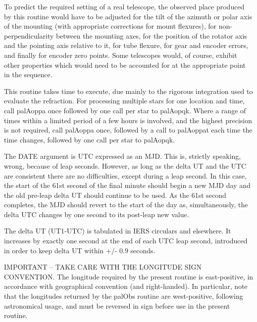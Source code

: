 \documentclass[twoside,11pt,nolof]{starlink}
\begin{document}
{{{         \sstitem
          To predict the required setting of a real telescope, the
           observed place produced by this routine would have to be
           adjusted for the tilt of the azimuth or polar axis of the
           mounting (with appropriate corrections for mount flexures),
           for non-perpendicularity between the mounting axes, for the
           position of the rotator axis and the pointing axis relative
           to it, for tube flexure, for gear and encoder errors, and
           finally for encoder zero points.  Some telescopes would, of
           course, exhibit other properties which would need to be
           accounted for at the appropriate point in the sequence.

         \sstitem
          This routine takes time to execute, due mainly to the
           rigorous integration used to evaluate the refraction.
           For processing multiple stars for one location and time,
           call palAoppa once followed by one call per star to palAopqk.
           Where a range of times within a limited period of a few hours
           is involved, and the highest precision is not required, call
           palAoppa once, followed by a call to palAoppat each time the
           time changes, followed by one call per star to palAopqk.

         \sstitem
          The DATE argument is UTC expressed as an MJD.  This is,
           strictly speaking, wrong, because of leap seconds.  However,
           as long as the delta UT and the UTC are consistent there
           are no difficulties, except during a leap second.  In this
           case, the start of the 61st second of the final minute should
           begin a new MJD day and the old pre-leap delta UT should
           continue to be used.  As the 61st second completes, the MJD
           should revert to the start of the day as, simultaneously,
           the delta UTC changes by one second to its post-leap new value.

         \sstitem
          The delta UT (UT1-UTC) is tabulated in IERS circulars and
           elsewhere.  It increases by exactly one second at the end of
           each UTC leap second, introduced in order to keep delta UT
           within $+$/- 0.9 seconds.

         \sstitem
          IMPORTANT -- TAKE CARE WITH THE LONGITUDE SIGN CONVENTION.
           The longitude required by the present routine is east-positive,
           in accordance with geographical convention (and right-handed).
           In particular, note that the longitudes returned by the
           palObs routine are west-positive, following astronomical
           usage, and must be reversed in sign before use in the present
           routine.

}}}
\end{document}
